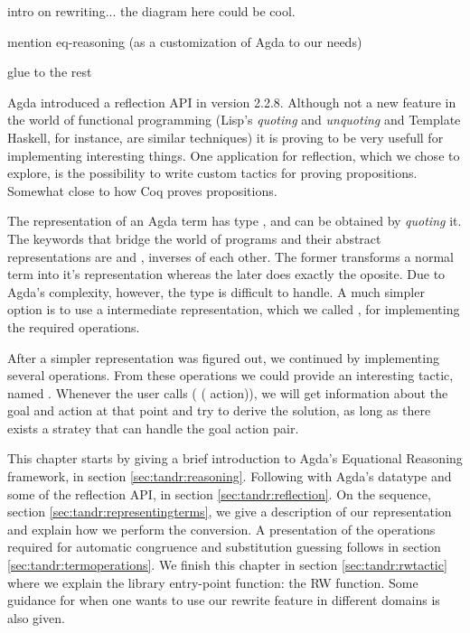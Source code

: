 \begin{TODO}
  \item intro on rewriting... the diagram here could be cool.
  \item mention eq-reasoning (as a customization of Agda to our needs)
  \item glue to the rest
\end{TODO}


Agda introduced a reflection API in version 2.2.8. Although not a new feature
in the world of functional programming (Lisp's \emph{quoting} and \emph{unquoting} 
and Template Haskell, for instance, are similar techniques) 
it is proving to be very usefull for implementing interesting things. 
One application for reflection, which we chose to explore, is 
the possibility to write custom tactics for proving propositions. 
Somewhat close to how Coq proves propositions.

The representation of an Agda term has type , and can be obtained
by \emph{quoting} it.
The keywords that bridge the world of programs and their abstract representations 
are  and , inverses of each other. 
The former transforms a normal term into it's  representation whereas the 
later does exactly the oposite. Due to Agda's complexity, however, the type  is difficult
to handle. A much simpler option is to use a intermediate representation, which we called ,
for implementing the required operations.

After a simpler representation was figured out, we continued by implementing several
 operations. From these operations we could provide an interesting tactic,
named . Whenever the user calls ( ( action)), we will get information
about the goal and action at that point and try to derive the solution, as long as there exists
a stratey that can handle the goal action pair.

This chapter starts by giving a brief introduction to Agda's Equational Reasoning framework, in section \ref{sec:tandr:reasoning}. Following with Agda's  datatype and some of the reflection API, in section \ref{sec:tandr:reflection}. 
On the sequence, section \ref{sec:tandr:representingterms}, we give a description of our  representation
and explain how we perform the conversion. A presentation of the operations required for 
automatic congruence and substitution guessing follows in section \ref{sec:tandr:termoperations}.
We finish this chapter in section \ref{sec:tandr:rwtactic} where we explain the library entry-point function: the RW function.
Some guidance for when one wants to use our rewrite feature in different domains is also given.
